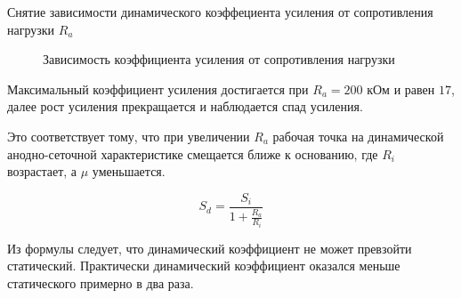 \documentclass[a4paper,12pt]{extarticle}%
\begin{document}
\begin{table}[H]
	\begin{center}
	\caption{Снятие зависимости динамического коэффециента усиления от сопротивления нагрузки $R_a$}
	\label{tab:a-s}


	\end{center}
\end{table}

\begin{figure}[H]
	\centering
		
	\caption{Зависимость коэффициента усиления от сопротивления нагрузки}
	\label{fig:ahx} 
\end{figure}

Максимальный коэффициент усиления достигается при $R_a=200$ кОм и равен $17$, далее рост усиления прекращается и наблюдается спад усиления.

Это соответствует тому, что при увеличении $R_a$ рабочая точка на динамической анодно-сеточной характеристике смещается ближе к основанию, где $R_i$ возрастает, а $\mu$ уменьшается. 

\begin{equation}
	\label{eq:s2}
	S_d=\frac
	{  
		S_i
	}
	{
		1+\frac{R_a}{R_i}
	}
\end{equation}

Из формулы следует, что динамический коэффициент не может превзойти статический. Практически динамический коэффициент оказался меньше статического примерно в два раза.


\newpage
\end{document}
